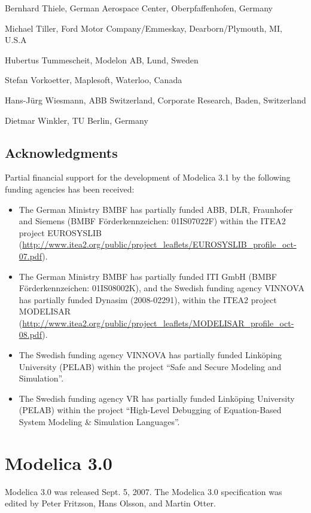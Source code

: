\documentclass[10pt,a4paper]{report}
\def\doublelabel#1{\label{#1}}
\begin{document}
Bernhard Thiele, German Aerospace Center, Oberpfaffenhofen, Germany

Michael Tiller, Ford Motor Company/Emmeskay, Dearborn/Plymouth, MI,
U.S.A

Hubertus Tummescheit, Modelon AB, Lund, Sweden

Stefan Vorkoetter, Maplesoft, Waterloo, Canada

Hans-Jürg Wiesmann, ABB Switzerland, Corporate Research, Baden,
Switzerland

Dietmar Winkler, TU Berlin, Germany

\subsection{Acknowledgments}\doublelabel{acknowledgments3}

Partial financial support for the development of Modelica 3.1 by the
following funding agencies has been received:

\begin{itemize}
\item
  The German Ministry BMBF has partially funded ABB, DLR, Fraunhofer and
  Siemens (BMBF Förderkennzeichen: 01IS07022F) within the ITEA2 project
  EUROSYSLIB
  (\url{http://www.itea2.org/public/project_leaflets/EUROSYSLIB_profile_oct-07.pdf}).
\item
  The German Ministry BMBF has partially funded ITI GmbH (BMBF
  Förderkennzeichen: 01IS08002K), and the Swedish funding agency VINNOVA
  has partially funded Dynasim (2008-02291), within the ITEA2 project
  MODELISAR
  (\url{http://www.itea2.org/public/project_leaflets/MODELISAR_profile_oct-08.pdf}).
\item
  The Swedish funding agency VINNOVA has partially funded Linköping
  University (PELAB) within the project ``Safe and Secure Modeling and
  Simulation''.
\item
  The Swedish funding agency VR has partially funded Linköping
  University (PELAB) within the project ``High-Level Debugging of
  Equation-Based System Modeling \& Simulation Languages''.
\end{itemize}

\section{Modelica 3.0}\doublelabel{modelica-3-0}

Modelica 3.0 was released Sept. 5, 2007. The Modelica 3.0 specification
was edited by Peter Fritzson, Hans Olsson, and Martin Otter.
\end{document}
